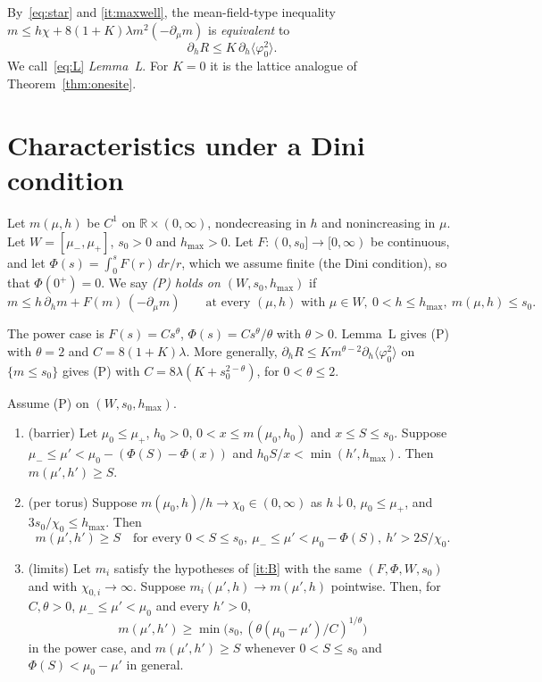 By~\eqref{eq:star} and \ref{it:maxwell}, the mean-field-type inequality $m\le h\chi+8(1+K)\lambda m^2(-\partial_\mu m)$ is \emph{equivalent} to
\begin{equation}\label{eq:L}
\partial_hR\le K\,\partial_h\langle\varphi_0^2\rangle .
\end{equation}
We call~\eqref{eq:L} \emph{Lemma~L}. For $K=0$ it is the lattice analogue of Theorem~\ref{thm:onesite}.

\section{Characteristics under a Dini condition}\label{sec:charact}

\begin{hypothesis}[P]
Let $m(\mu,h)$ be $C^1$ on $\mathbb R\times(0,\infty)$, nondecreasing in $h$ and nonincreasing in $\mu$. Let $W=[\mu_-,\mu_+]$, $s_0>0$ and $h_{\max}>0$. Let $F\colon(0,s_0]\to[0,\infty)$ be continuous, and let $\Phi(s)=\int_0^sF(r)\,dr/r$, which we assume finite (the Dini condition), so that $\Phi(0^+)=0$. We say \emph{(P) holds on $(W,s_0,h_{\max})$} if
\begin{equation}\label{eq:P}
m\le h\,\partial_hm+F(m)\,(-\partial_\mu m)\qquad\text{at every }(\mu,h)\text{ with }\mu\in W,\ 0<h\le h_{\max},\ m(\mu,h)\le s_0 .
\end{equation}
\end{hypothesis}

The power case is $F(s)=Cs^\theta$, $\Phi(s)=Cs^\theta/\theta$ with $\theta>0$. Lemma~L gives (P) with $\theta=2$ and $C=8(1+K)\lambda$. More generally, $\partial_hR\le Km^{\theta-2}\partial_h\langle\varphi_0^2\rangle$ on $\{m\le s_0\}$ gives (P) with $C=8\lambda(K+s_0^{2-\theta})$, for $0<\theta\le2$.

\begin{theorem}\label{thm:charact}
Assume (P) on $(W,s_0,h_{\max})$.
\begin{enumerate}
\item\label{it:A} (barrier) Let $\mu_0\le\mu_+$, $h_0>0$, $0<x\le m(\mu_0,h_0)$ and $x\le S\le s_0$. Suppose $\mu_-\le\mu'<\mu_0-(\Phi(S)-\Phi(x))$ and $h_0S/x<\min(h',h_{\max})$. Then $m(\mu',h')\ge S$.
\item\label{it:B} (per torus) Suppose $m(\mu_0,h)/h\to\chi_0\in(0,\infty)$ as $h\downarrow0$, $\mu_0\le\mu_+$, and $3s_0/\chi_0\le h_{\max}$. Then
\[
m(\mu',h')\ge S\quad\text{for every }0<S\le s_0,\ \mu_-\le\mu'<\mu_0-\Phi(S),\ h'>2S/\chi_0 .
\]
\item\label{it:lim} (limits) Let $m_i$ satisfy the hypotheses of \ref{it:B} with the same $(F,\Phi,W,s_0)$ and with $\chi_{0,i}\to\infty$. Suppose $m_i(\mu',h)\to m(\mu',h)$ pointwise. Then, for $C,\theta>0$, $\mu_-\le\mu'<\mu_0$ and every $h'>0$,
\[
m(\mu',h')\ge\min\big(s_0,(\theta(\mu_0-\mu')/C)^{1/\theta}\big)
\]
in the power case, and $m(\mu',h')\ge S$ whenever $0<S\le s_0$ and $\Phi(S)<\mu_0-\mu'$ in general.
\end{enumerate}
\end{theorem}

